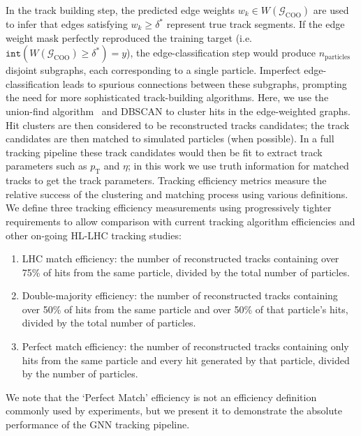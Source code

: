 \documentclass[twocolumn]{svjour3}
\newcommand{\pt}{\ensuremath{p_{\mathrm{T}}}\xspace}
\begin{document}
In the track building step, the predicted edge weights $w_k\in W(\mathcal{G}_\mathrm{COO})$ are used to infer that edges satisfying $w_k\geq\delta^*$ represent true track segments. 
If the edge weight mask perfectly reproduced the training target (i.e. $\mathtt{int}(W(\mathcal{G}_\mathrm{COO})\geq\delta^*)=y$), the edge-classification step would produce $n_\mathrm{particles}$ disjoint subgraphs, each corresponding to a single particle. 
Imperfect edge-classification leads to spurious connections between these subgraphs, prompting the need for more sophisticated track-building algorithms. 
Here, we use the union-find algorithm~\cite{unionfind} and DBSCAN to cluster hits in the edge-weighted graphs. 
Hit clusters are then considered to be reconstructed tracks candidates; the track candidates are then matched to simulated particles (when possible). In a full tracking pipeline these track candidates would then be fit to extract track parameters such as $\pt$ and $\eta$; in this work we use truth information for matched tracks to get the track parameters.
Tracking efficiency metrics measure the relative success of the clustering and matching process using various definitions. 
We define three tracking efficiency measurements using progressively tighter requirements to allow comparison with current tracking algorithm efficiencies and other on-going HL-LHC tracking studies:
\begin{enumerate}
    \item LHC match efficiency: the number of reconstructed tracks containing over 75\% of hits from the same particle, divided by the total number of particles.
    \item Double-majority efficiency: the number of reconstructed tracks containing over 50\% of hits from the same particle and over 50\% of that particle's hits, divided by the total number of particles.
    \item Perfect match efficiency: the number of reconstructed tracks containing only hits from the same particle and every hit generated by that particle, divided by the number of particles.
\end{enumerate}
We note that the `Perfect Match' efficiency is not an efficiency definition commonly used by experiments, but we present it to demonstrate the absolute performance of the GNN tracking pipeline. 
\end{document}
